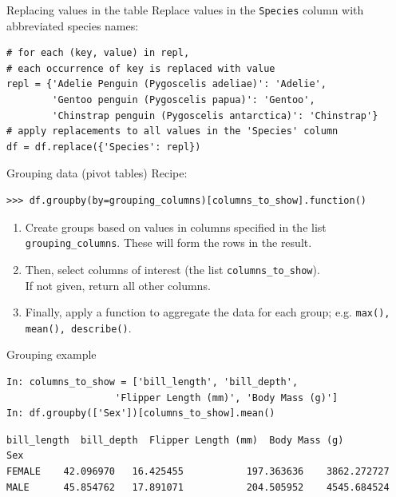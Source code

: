 \documentclass[aspectratio=169,usenames,dvipsnames]{beamer}
\begin{document}
\begin{frame}[fragile]{Replacing values in the table}
Replace values in the \texttt{Species} column with abbreviated species names:
\begin{lstlisting}
# for each (key, value) in repl,
# each occurrence of key is replaced with value
repl = {'Adelie Penguin (Pygoscelis adeliae)': 'Adelie',
        'Gentoo penguin (Pygoscelis papua)': 'Gentoo',
        'Chinstrap penguin (Pygoscelis antarctica)': 'Chinstrap'}
# apply replacements to all values in the 'Species' column
df = df.replace({'Species': repl})
\end{lstlisting}
\end{frame}


\begin{frame}[fragile]{Grouping data (pivot tables)}
Recipe:
\begin{lstlisting}
>>> df.groupby(by=grouping_columns)[columns_to_show].function()
\end{lstlisting}

\begin{enumerate}
\item Create groups based on values in columns specified
    in the list \lstinline{grouping_columns}.
    These will form the rows in the result.
\item Then, select columns of interest (the list \lstinline{columns_to_show}). \\
    If not given, return all other columns.
\item Finally, apply a function to aggregate the data for each group;
    e.g. \lstinline{max(), mean(), describe()}.
\end{enumerate}
\end{frame}


\begin{frame}[fragile]{Grouping example}
\begin{lstlisting}
In: columns_to_show = ['bill_length', 'bill_depth',
                   'Flipper Length (mm)', 'Body Mass (g)']
In: df.groupby(['Sex'])[columns_to_show].mean()
\end{lstlisting}\vspace{-1em}\begin{lstlisting}[style=plain]
        bill_length  bill_depth  Flipper Length (mm)  Body Mass (g)
Sex                                                                
FEMALE    42.096970   16.425455           197.363636    3862.272727
MALE      45.854762   17.891071           204.505952    4545.684524
\end{lstlisting}
\end{frame}
\end{document}
